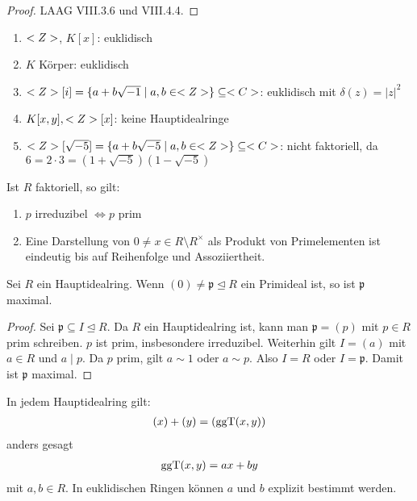 \begin{proof}
	LAAG VIII.3.6 und VIII.4.4.
\end{proof}

\begin{example}
	\begin{enumerate}[label=(\alph*)]
		\item $<Z>$, $K[x]$: euklidisch
		\item $K$ Körper: euklidisch
		\item $<Z>[i] = \{ a+b\sqrt{-1} \mid a,b \in <Z> \} \subseteq <C>$: euklidisch mit $\delta(z) = \vert z \vert^2$
		\item $K[x,y], <Z>[x]$: keine Hauptidealringe
		\item $<Z>[\sqrt{-5}] = \{ a+b\sqrt{-5} \mid a,b \in <Z> \} \subseteq <C>$: nicht faktoriell, da $6 = 2\cdot 3 = (1 + \sqrt{-5})(1-\sqrt{-5})$
	\end{enumerate}
\end{example}

\begin{remark}
	Ist $R$ faktoriell, so gilt:
	\begin{enumerate}[label=(\alph*)]
		\item $p$ irreduzibel $\Leftrightarrow p$ prim
		\item Eine Darstellung von $0 \neq x \in R \setminus R^{\times}$ als Produkt von Primelementen ist eindeutig bis auf Reihenfolge und Assoziiertheit.
	\end{enumerate}
\end{remark}

\begin{proposition}
	Sei $R$ ein Hauptidealring. Wenn $(0) \neq \mathfrak{p} \unlhd R$ ein Primideal ist, so ist $\mathfrak{p}$ maximal.
\end{proposition}

\begin{proof}
	Sei $\mathfrak{p} \subseteq I \unlhd R$. Da $R$ ein Hauptidealring ist, kann man $\mathfrak{p} = (p)$ mit $p \in R$ prim schreiben. $p$ ist prim, insbesondere irreduzibel. Weiterhin gilt $I = (a)$ mit $a \in R$ und $a \mid p$. Da $p$ prim, gilt $a \sim 1$ oder $a \sim p$. Also $I = R$ oder $I = \mathfrak{p}$. Damit ist $\mathfrak{p}$ maximal.
\end{proof}

\begin{remark}
	In jedem Hauptidealring gilt:
	\begin{align}
		(x) + (y) = (\operatorname{ggT}(x,y)) \notag
	\end{align}
	anders gesagt
	\begin{align}
		\operatorname{ggT}(x,y) = ax + by \notag
	\end{align}
	mit $a,b \in R$. In euklidischen Ringen können $a$ und $b$ explizit bestimmt werden.
\end{remark}

